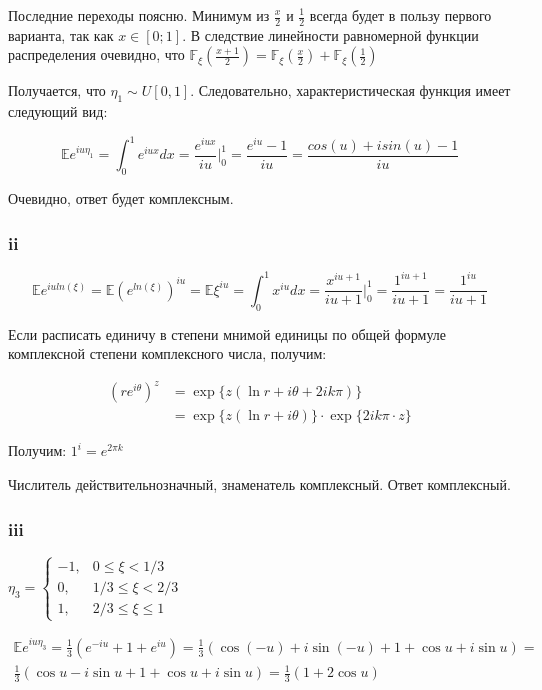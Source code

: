 \documentclass[a4paper,12pt]{article}
\def \mbb{\mathbb}
\def \E{\mbb{E}}
\def \F{\mbb{F}}
\begin{document}
Последние переходы поясню. Минимум из $ \frac{x}{2} $ и $ \frac{1}{2} $ всегда будет в пользу первого варианта, так как $ x \in [0;1] $. В следствие линейности равномерной функции распределения очевидно, что $ \F_\xi(\frac{x + 1}{2}) =  \F_\xi(\frac{x}{2}) + \F_\xi(\frac{1}{2}) $

Получается, что $ \eta_1 \sim U[0,1] $. Следовательно, характеристическая функция имеет следующий вид:

\[ \E e^{iu\eta_1} = \int_{0}^{1} e^{iux} dx =\frac{ e^{iux} }{iu}\biggr|_0^1 = \frac{e^{iu} - 1}{iu} = \frac{cos(u) + i sin(u) - 1}{iu}\]

Очевидно, ответ будет комплексным.


\subsubsection{ii}

\[ \E e^{iuln(\xi)}  = \E (e^{ln(\xi)})^{iu} = \E \xi^{iu} = \int_{0}^{1} x^{iu} dx =\frac{ x^{iu+1}}{iu+1} \biggr|_0^1 = \frac{1^{iu+1}}{iu+1} = \frac{ 1^{iu}}{iu+1}\]

Если расписать единичу в степени мнимой единицы по общей формуле комплексной степени комплексного числа, получим:

\[\begin{aligned}\left(r e^{i \theta}\right)^{z} &=\exp \{z(\ln r+i \theta+2 i k \pi)\} \\ &=\exp \{z(\ln r+i \theta)\} \cdot \exp \{2 i k \pi \cdot z\} \end{aligned}\]

Получим: $ 1^i = e^{2\pi k} $

Числитель действительнозначный, знаменатель комплексный. Ответ комплексный.


\subsubsection{iii}

$\eta_{3}=\left\{\begin{array}{ll}{-1,} & {0 \leq \xi<1 / 3} \\ {0,} & {1 / 3 \leq \xi<2 / 3} \\ {1,} & {2 / 3 \leq \xi \leq 1}\end{array}\right.$



\begin{equation}
\begin{aligned}
\E e^{iu\eta_3}  = \frac{1}{3} (e^{-iu}  + 1 + e^{iu}) =\frac{1}{3}(\cos (-u)+i \sin (-u)+1+\cos u+i \sin u)=\\ \frac{1}{3}(\cos u-i \sin u+1+\cos u+i \sin u)=\frac{1}{3}(1+2 \cos u)
\end{aligned}
\end{equation}
\end{document}
